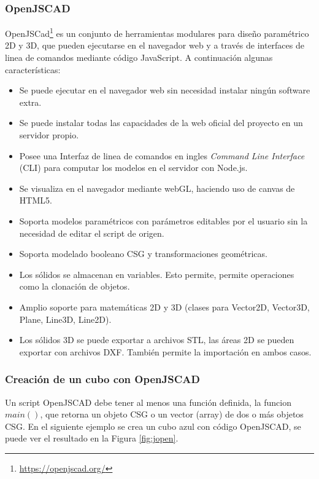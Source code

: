 \subsubsection{OpenJSCAD}

OpenJSCad\footnote{\url{https://openjscad.org/}}
es un conjunto de herramientas modulares para diseño paramétrico 2D y 3D, que pueden ejecutarse en el navegador web y a través de interfaces de linea de comandos mediante código JavaScript. A continuación algunas características:

\begin{itemize}
    \item Se puede ejecutar en el navegador web sin necesidad instalar ningún software extra.
    \item Se puede instalar todas las capacidades de la web oficial del proyecto en un servidor propio.
    \item Posee una Interfaz de linea de comandos en ingles \textit{Command Line Interface} (CLI) para computar los modelos en el servidor con Node.js.
    \item Se visualiza en el navegador mediante webGL, haciendo uso de canvas de HTML5.
    \item Soporta modelos paramétricos con parámetros editables por el usuario sin la necesidad de editar el script de origen.
    \item Soporta modelado booleano CSG y transformaciones geométricas.
    \item Los sólidos se almacenan en variables. Esto permite, permite operaciones como la clonación de objetos.
    \item Amplio soporte para matemáticas 2D y 3D (clases para Vector2D, Vector3D, Plane, Line3D, Line2D).
    \item Los sólidos 3D se puede exportar a archivos STL, las áreas 2D se pueden exportar con archivos DXF. También permite la importación en ambos casos.
\end{itemize}

\subsubsection{Creación de un cubo con OpenJSCAD}

Un script OpenJSCAD debe tener al menos una función definida, la funcion $main()$, que retorna un objeto CSG o un vector (array) de dos o más objetos CSG. En el siguiente ejemplo se crea un cubo azul con código OpenJSCAD, se puede ver el resultado en la Figura \ref{fig:jopen}. 

